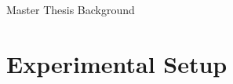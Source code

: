 \documentclass[10pt]{beamer}
\begin{document}
\begin{frame}{Master Thesis Background}
\begin{figure}
\begin{minipage}{0.5\textwidth}
	\end{minipage}
	
\end{figure}

\end{frame}

%	
	
	
		\section{Experimental Setup}
		
\end{document}

